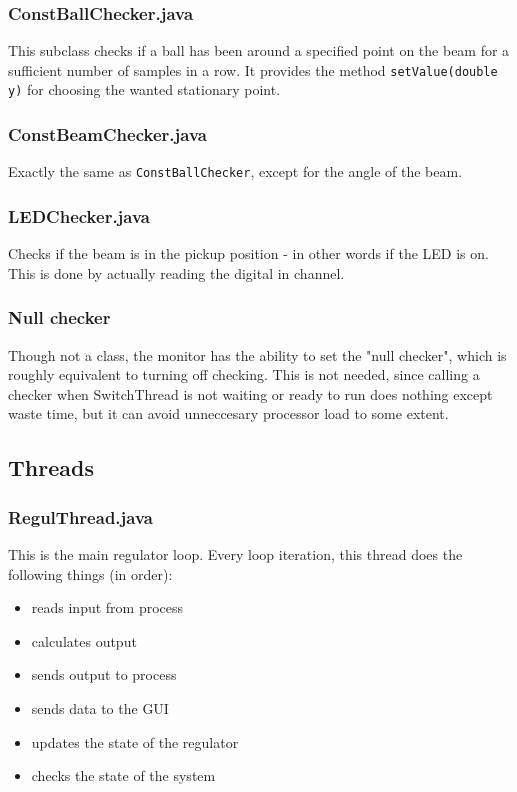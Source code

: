 \subsubsection{ConstBallChecker.java}
This subclass checks if a ball has been around a specified point on the beam for a sufficient number of samples in a row. It provides the method \texttt{setValue(double y)} for choosing the wanted stationary point.

\subsubsection{ConstBeamChecker.java}
Exactly the same as \texttt{ConstBallChecker}, except for the angle of the beam.

\subsubsection{LEDChecker.java}
Checks if the beam is in the pickup position - in other words if the LED is on. This is done by actually reading the digital in channel.

\subsubsection{Null checker}
Though not a class, the monitor has the ability to set the "null checker", which is roughly equivalent to turning off checking. This is not needed, since calling a checker when SwitchThread is not waiting or ready to run does nothing except waste time, but it can avoid unneccesary processor load to some extent.








\subsection{Threads}

\subsubsection{RegulThread.java}
This is the main regulator loop. Every loop iteration, this thread does the following things (in order):
\begin{itemize}
\item reads input from process
\item calculates output
\item sends output to process
\item sends data to the GUI
\item updates the state of the regulator
\item checks the state of the system
\end{itemize}


